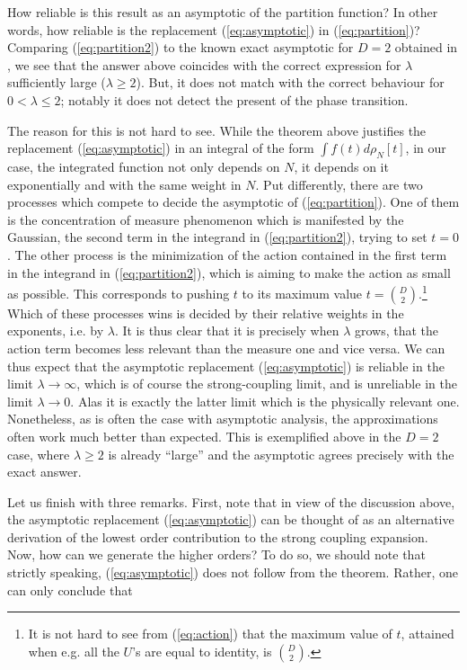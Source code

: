 \documentclass[twoside, a4paper,10pt]{article}
\begin{document}
How reliable is this result as an asymptotic of the partition function? In other words, how reliable is the replacement (\ref{eq:asymptotic}) in (\ref{eq:partition})? Comparing (\ref{eq:partition2}) to the known exact asymptotic for $D = 2$ obtained in \cite{grosswitten}, we see that the answer above coincides with the correct expression for $\lambda$ sufficiently large ($\lambda \geq 2$). But, it does not match with the correct behaviour for $0< \lambda \leq 2$; notably it does not detect the present of the phase transition. \newline

The reason for this is not hard to see. While the theorem above justifies the replacement (\ref{eq:asymptotic}) in an integral of the form $\int f(t) d\rho_N[t]$, in our case, the integrated function not only depends on $N$, it depends on it exponentially and with the same weight in $N$. Put differently, there are two processes which compete to decide the asymptotic of (\ref{eq:partition}). One of them is the concentration of measure phenomenon which is manifested by the Gaussian, the second term in the integrand in (\ref{eq:partition2}), trying to set $t = 0$. The other process is the minimization of the action contained in the first term in the integrand in (\ref{eq:partition2}), which is aiming to make the action as small as possible. This corresponds to pushing $t$ to its maximum value $t = {D \choose 2}$.\footnote{It is not hard to see from (\ref{eq:action}) that the maximum value of $t$, attained when e.g. all the $U$'s are equal to identity, is ${D \choose 2}$.} Which of these processes wins is decided by their relative weights in the exponents, i.e. by $\lambda$. It is thus clear that it is precisely when $\lambda$ grows, that the action term becomes less relevant than the measure one and vice versa. We can thus expect that the asymptotic replacement (\ref{eq:asymptotic}) is reliable in the limit $\lambda \to \infty$, which is of course the strong-coupling limit, and is unreliable in the limit $\lambda \to 0$. Alas it is exactly the latter limit which is the physically relevant one. Nonetheless, as is often the case with asymptotic analysis, the approximations often work much better than expected. This is exemplified above in the $D = 2$ case, where $\lambda \geq 2$ is already ``large'' and the asymptotic agrees precisely with the exact answer.\newline

Let us finish with three remarks. First, note that in view of the discussion above, the asymptotic replacement (\ref{eq:asymptotic}) can be thought of as an alternative derivation of the lowest order contribution to the strong coupling expansion. Now, how can we generate the higher orders? To do so, we should note that strictly speaking, (\ref{eq:asymptotic}) does not follow from the theorem. Rather, one can only conclude that 
\end{document}
